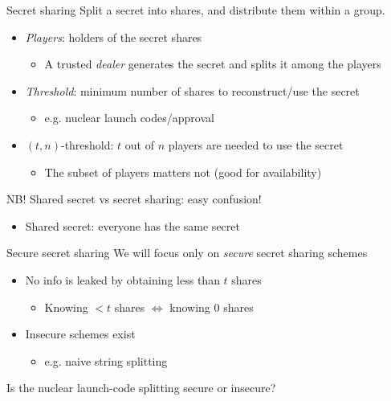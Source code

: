 \begin{frame}{Secret sharing}
  Split a secret into shares, and distribute them within a group.
  \begin{itemize}[<+(1)->]
    \item \emph{Players}: holders of the secret shares
    \begin{itemize}
      \item A trusted \emph{dealer} generates the secret and splits it among the players
    \end{itemize}
    \item \emph{Threshold}: minimum number of shares to reconstruct/use the secret
    \begin{itemize}
      \item e.g. nuclear launch codes/approval
    \end{itemize}
    \item $(t, n)$-threshold: $t$ out of $n$ players are needed to use the secret
    \begin{itemize}
      \item The subset of players matters not (good for availability)
    \end{itemize}
  \end{itemize}

  \vspace*{1em}

  \pause
  NB! Shared secret vs secret sharing: easy confusion!
  \begin{itemize}[<+(1)->]
    \item Shared secret: everyone has the same secret
  \end{itemize}
\end{frame}

\begin{frame}{Secure secret sharing}
  We will focus only on \emph{secure} secret sharing schemes
  \begin{itemize}[<+(1)->]
    \item No info is leaked by obtaining less than $t$ shares
    \begin{itemize}
      \item Knowing $<t$ shares $\iff$ knowing $0$ shares
    \end{itemize}
    \item Insecure schemes exist
    \begin{itemize}
      \item e.g. naive string splitting
    \end{itemize}
  \end{itemize}

  \vspace*{1em}

  \pause
  Is the nuclear launch-code splitting secure or insecure?
\end{frame}

